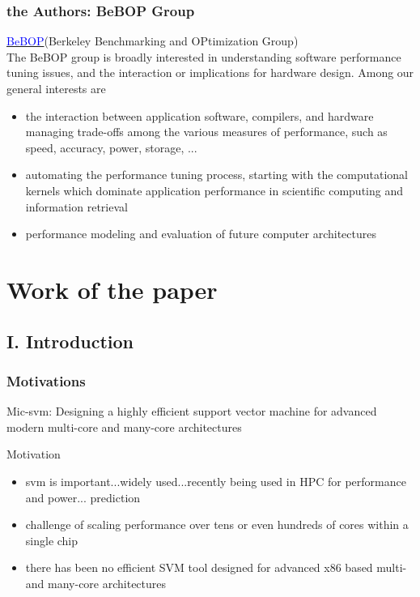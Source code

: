 \documentclass{beamer}
\begin{document}
\begin{frame}
	\frametitle{the Authors: BeBOP Group}
	\href{http://bebop.cs.berkeley.edu/}{\textcolor{blue}{BeBOP}}(Berkeley Benchmarking and OPtimization Group) \\
	The BeBOP group is broadly interested in understanding software performance tuning issues, and the interaction or implications for hardware design. Among our general interests are
		\begin{itemize}
			\item 	
	the interaction between application software, compilers, and hardware
	managing trade-offs among the various measures of performance, such as speed, accuracy, power, storage, ...
				\item 
	automating the performance tuning process, starting with the computational kernels which dominate application performance in scientific computing and information retrieval
				\item 
	performance modeling and evaluation of future computer architectures
			\end{itemize}
\end{frame}


\section{Work of the paper} %
\subsection{I. Introduction} 
\begin{frame}
	\frametitle{Motivations}
	Mic-svm: Designing a highly efficient support vector machine for advanced modern multi-core and many-core architectures
	\begin{block}{Motivation}
		\begin{itemize}
			\item svm is important...widely used...recently being used in HPC for performance and power...
			prediction
			\item challenge
			of scaling performance over tens or even hundreds of cores within a
			single chip
			\item there has been
			no efficient SVM tool designed for advanced x86 based multi- and
			many-core architectures
		\end{itemize}		
	\end{block}
	
\end{frame}
\end{document}
